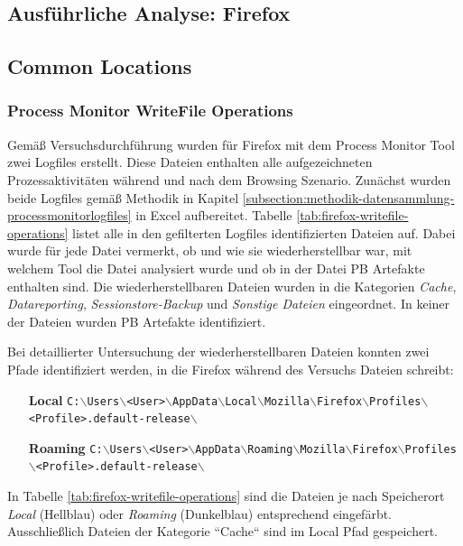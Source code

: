 \begin{appendices}
		\section{Ausführliche Analyse: Firefox}
		\subsection{Common Locations}
		\label{subsection:appendix-firefox-common-locations}
		\subsubsection*{Process Monitor WriteFile Operations}
		\label{subsubsection:appendix-firefox-common-locations-writefile-operations}
		Gemäß Versuchsdurchführung wurden für Firefox mit dem Process Monitor Tool zwei Logfiles erstellt. Diese Dateien enthalten alle aufgezeichneten Prozessaktivitäten während und nach dem Browsing Szenario.
		Zunächst wurden beide Logfiles gemäß Methodik in Kapitel \ref{subsection:methodik-datensammlung-processmonitorlogfiles} in Excel aufbereitet. Tabelle \ref{tab:firefox-writefile-operations} listet alle in den gefilterten Logfiles identifizierten Dateien auf. Dabei wurde für jede Datei vermerkt, ob und wie sie wiederherstellbar war, mit welchem Tool die Datei analysiert wurde und ob in der Datei PB Artefakte enthalten sind. Die wiederherstellbaren Dateien wurden in die Kategorien \textit{Cache}, \textit{Datareporting}, \textit{Sessionstore-Backup} und \textit{Sonstige Dateien} eingeordnet. In keiner der Dateien wurden PB Artefakte identifiziert.
		
		Bei detaillierter Untersuchung der wiederherstellbaren Dateien konnten zwei Pfade identifiziert werden, in die Firefox während des Versuchs Dateien schreibt: 
		\begin{itemize}
			\item[\textbf{Local}] \texttt{C:$\backslash$Users$\backslash$<User>$\backslash$AppData$\backslash$Local$\backslash$Mozilla$\backslash$Firefox$\backslash$Profiles$\backslash$<Profile>.default-release$\backslash$}
			\item[\textbf{Roaming}] \texttt{C:$\backslash$Users$\backslash$<User>$\backslash$AppData$\backslash$Roaming$\backslash$Mozilla$\backslash$Firefox$\backslash$Profiles$\backslash$<Profile>.default-release$\backslash$}
		\end{itemize}
		In Tabelle 	\ref{tab:firefox-writefile-operations} sind die Dateien je nach Speicherort \textit{Local} (Hellblau) oder \textit{Roaming} (Dunkelblau) entsprechend eingefärbt. Ausschließlich Dateien der Kategorie ``Cache`` sind im Local Pfad gespeichert.
		

\end{appendices}
